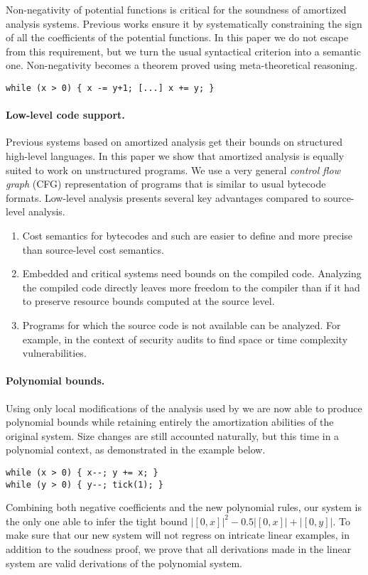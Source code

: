 \documentclass[nocopyrightspace,preprint]{sigplanconf-pldi15}
\begin{document}
Non-negativity of potential functions is critical for
the soundness of amortized analysis systems.  Previous
works ensure it by systematically constraining the sign
of all the
coefficients of the potential functions.
In this paper we do not escape from this requirement,
but we turn the usual syntactical criterion into a
semantic one. Non-negativity becomes a theorem proved
using meta-theoretical reasoning.

\begin{lstlisting}
while (x > 0) { x -= y+1; [...] x += y; }
\end{lstlisting}

\paragraph{Low-level code support.}
Previous systems based on amortized analysis get their
bounds on structured high-level languages.  In this paper
we show that amortized analysis is equally suited to
work on unstructured programs.  We use a very general
\emph{control flow graph} (CFG) representation of programs
that is similar to usual bytecode formats.
Low-level analysis presents several key advantages compared
to source-level analysis.
\begin{enumerate}
\item Cost semantics for bytecodes and such are easier to
      define and more precise than source-level cost
      semantics.
\item Embedded and critical systems need bounds on the
      compiled code.  Analyzing the compiled code directly
      leaves more freedom to the compiler than if it had
      to preserve resource bounds computed at the source
      level.
\item Programs for which the source code is not available
      can be analyzed.  For example, in the context of
      security audits to find space or time complexity
      vulnerabilities.
\end{enumerate}

\paragraph{Polynomial bounds.}
Using only local modifications of the analysis used by
\toolname{} we are now able to produce polynomial bounds
while retaining entirely the amortization abilities of
the original system.  Size changes are still accounted
naturally, but this time in a polynomial context, as
demonstrated in the example below.
%
\begin{lstlisting}
while (x > 0) { x--; y += x; }
while (y > 0) { y--; tick(1); }
\end{lstlisting}
%
Combining both negative coefficients and the new
polynomial rules, our system is the only one able
to infer the tight bound $|[0,x]|^2 - 0.5 |[0,x]| +
|[0,y]|$.  To make sure that our new
system will not regress on intricate
linear examples, in addition to the soudness proof,
we prove that all derivations made in the linear
system are valid derivations of the polynomial
system.
\end{document}
